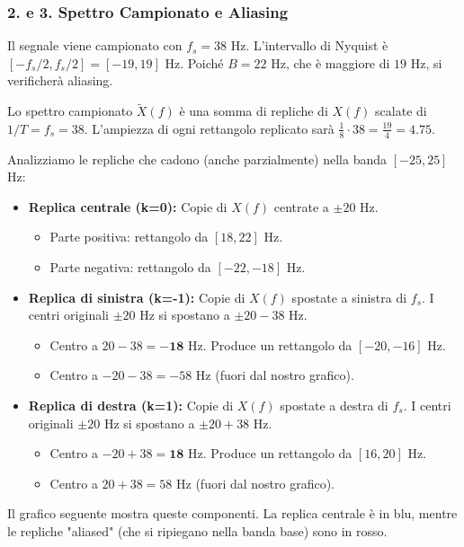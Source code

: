 \begin{soluzione}{10}
    \subsubsection*{2. e 3. Spettro Campionato e Aliasing}
    Il segnale viene campionato con $f_s = 38$ Hz. L'intervallo di Nyquist è $[-f_s/2, f_s/2] = [-19, 19]$ Hz. Poiché $B=22$ Hz, che è maggiore di $19$ Hz, si verificherà aliasing.
    
    Lo spettro campionato $\tilde{X}(f)$ è una somma di repliche di $X(f)$ scalate di $1/T=f_s=38$. L'ampiezza di ogni rettangolo replicato sarà $\frac{1}{8} \cdot 38 = \frac{19}{4} = 4.75$.
    
    Analizziamo le repliche che cadono (anche parzialmente) nella banda $[-25, 25]$ Hz:
    \begin{itemize}
        \item \textbf{Replica centrale (k=0):} Copie di $X(f)$ centrate a $\pm 20$ Hz.
            \begin{itemize}
                \item Parte positiva: rettangolo da $[18, 22]$ Hz.
                \item Parte negativa: rettangolo da $[-22, -18]$ Hz.
            \end{itemize}
        \item \textbf{Replica di sinistra (k=-1):} Copie di $X(f)$ spostate a sinistra di $f_s$. I centri originali $\pm 20$ Hz si spostano a $\pm 20 - 38$ Hz.
            \begin{itemize}
                \item Centro a $20 - 38 = \mathbf{-18}$ Hz. Produce un rettangolo da $[-20, -16]$ Hz.
                \item Centro a $-20-38 = -58$ Hz (fuori dal nostro grafico).
            \end{itemize}
        \item \textbf{Replica di destra (k=1):} Copie di $X(f)$ spostate a destra di $f_s$. I centri originali $\pm 20$ Hz si spostano a $\pm 20 + 38$ Hz.
            \begin{itemize}
                \item Centro a $-20 + 38 = \mathbf{18}$ Hz. Produce un rettangolo da $[16, 20]$ Hz.
                \item Centro a $20+38 = 58$ Hz (fuori dal nostro grafico).
            \end{itemize}
    \end{itemize}
    Il grafico seguente mostra queste componenti. La replica centrale è in blu, mentre le repliche "aliased" (che si ripiegano nella banda base) sono in rosso.
    

\end{soluzione}
